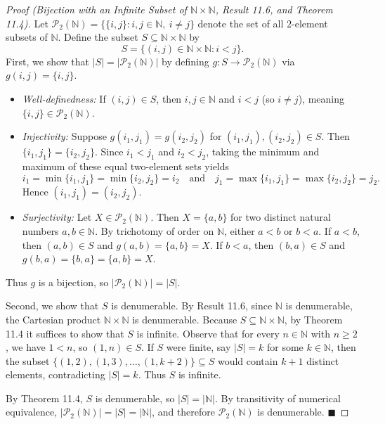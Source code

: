 \documentclass[11pt, letterpaper]{article}
\theoremstyle{definition}
\theoremstyle{remark}
\begin{document}
\begin{proof}[Proof (Bijection with an Infinite Subset of $\mathbb{N} \times \mathbb{N}$, Result 11.6, and Theorem 11.4)]
Let $\mathcal{P}_2(\mathbb{N}) = \{\{i, j\} : i, j \in \mathbb{N},\ i \neq j\}$ denote the set of all $2$-element subsets of $\mathbb{N}$. Define the subset $S \subseteq \mathbb{N} \times \mathbb{N}$ by
\[
S = \{(i, j) \in \mathbb{N} \times \mathbb{N} : i < j\}.
\]
First, we show that $|S| = |\mathcal{P}_2(\mathbb{N})|$ by defining $g : S \to \mathcal{P}_2(\mathbb{N})$ via $g(i, j) = \{i, j\}$.
\begin{itemize}
    \item \textit{Well-definedness:} If $(i, j) \in S$, then $i, j \in \mathbb{N}$ and $i < j$ (so $i \neq j$), meaning $\{i, j\} \in \mathcal{P}_2(\mathbb{N})$.
    \item \textit{Injectivity:} Suppose $g(i_1, j_1) = g(i_2, j_2)$ for $(i_1, j_1), (i_2, j_2) \in S$. Then $\{i_1, j_1\} = \{i_2, j_2\}$. Since $i_1 < j_1$ and $i_2 < j_2$, taking the minimum and maximum of these equal two-element sets yields
    \[
    i_1 = \min\{i_1, j_1\} = \min\{i_2, j_2\} = i_2 \quad \text{and} \quad j_1 = \max\{i_1, j_1\} = \max\{i_2, j_2\} = j_2.
    \]
    Hence $(i_1, j_1) = (i_2, j_2)$.
    \item \textit{Surjectivity:} Let $X \in \mathcal{P}_2(\mathbb{N})$. Then $X = \{a, b\}$ for two distinct natural numbers $a, b \in \mathbb{N}$. By trichotomy of order on $\mathbb{N}$, either $a < b$ or $b < a$. If $a < b$, then $(a, b) \in S$ and $g(a, b) = \{a, b\} = X$. If $b < a$, then $(b, a) \in S$ and $g(b, a) = \{b, a\} = \{a, b\} = X$.
\end{itemize}
Thus $g$ is a bijection, so $|\mathcal{P}_2(\mathbb{N})| = |S|$.

Second, we show that $S$ is denumerable. By Result 11.6, since $\mathbb{N}$ is denumerable, the Cartesian product $\mathbb{N} \times \mathbb{N}$ is denumerable. Because $S \subseteq \mathbb{N} \times \mathbb{N}$, by Theorem 11.4 it suffices to show that $S$ is infinite. Observe that for every $n \in \mathbb{N}$ with $n \geq 2$, we have $1 < n$, so $(1, n) \in S$. If $S$ were finite, say $|S| = k$ for some $k \in \mathbb{N}$, then the subset $\{(1, 2), (1, 3), \dots, (1, k + 2)\} \subseteq S$ would contain $k + 1$ distinct elements, contradicting $|S| = k$. Thus $S$ is infinite.

By Theorem 11.4, $S$ is denumerable, so $|S| = |\mathbb{N}|$. By transitivity of numerical equivalence, $|\mathcal{P}_2(\mathbb{N})| = |S| = |\mathbb{N}|$, and therefore $\mathcal{P}_2(\mathbb{N})$ is denumerable. $\blacksquare$
\end{proof}
\end{document}
